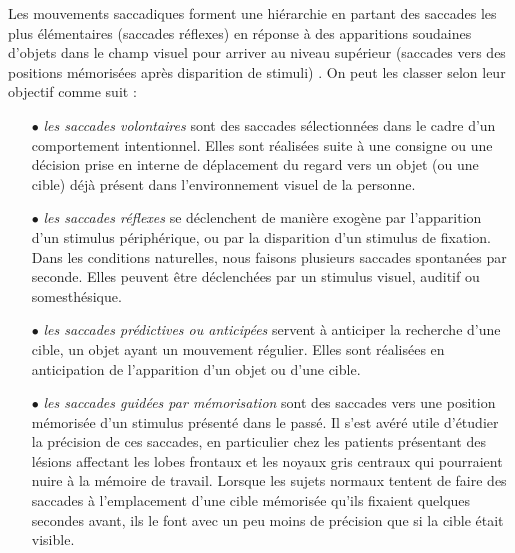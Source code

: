 Les mouvements saccadiques forment une hiérarchie en partant des saccades les plus élémentaires (saccades réflexes) en réponse à des apparitions soudaines d'objets dans le champ visuel pour arriver au niveau supérieur (saccades vers des positions mémorisées après disparition de stimuli) \cite{Leigh:1999}. On peut les classer selon leur objectif comme suit :\\
\begin{itemize}

\item[$\bullet$]{\em les saccades volontaires} sont des saccades sélectionnées dans le cadre d'un comportement intentionnel. Elles sont réalisées suite à une consigne ou une décision prise en interne de déplacement du regard vers un objet (ou une cible) déjà présent dans l'environnement visuel de la personne.\\

\item[$\bullet$]{\em les saccades réflexes} se déclenchent de manière exogène par l'apparition d'un stimulus périphérique, ou par la disparition d'un stimulus de fixation. Dans les conditions naturelles, nous faisons plusieurs saccades spontanées par seconde. Elles peuvent être déclenchées par un stimulus visuel, auditif ou somesthésique.\\

\item[$\bullet$]{\em les saccades prédictives ou anticipées} servent à anticiper la recherche d'une cible, un objet ayant un mouvement régulier. Elles sont réalisées en anticipation de l'apparition d'un objet ou d'une cible.\\


\item[$\bullet$]{\em les saccades guidées par mémorisation} sont des saccades vers une position mémorisée d'un stimulus présenté dans le passé. Il s'est avéré utile d'étudier la précision de ces saccades, en particulier chez les patients présentant des lésions affectant les lobes frontaux et les noyaux gris centraux qui pourraient nuire à la mémoire de travail. Lorsque les sujets normaux tentent de faire des saccades à l'emplacement d'une cible mémorisée qu'ils fixaient quelques secondes avant, ils le font avec un peu moins de précision que si la cible était visible.\\


\end{itemize}
